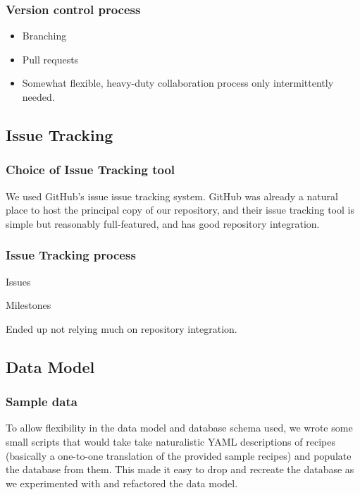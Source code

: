 \subsubsection{Version control process}

\begin{itemize}
\item Branching
\item Pull requests
\item Somewhat flexible, heavy-duty collaboration process only
  intermittently needed.
\end{itemize}

\subsection{Issue Tracking}

\subsubsection{Choice of Issue Tracking tool}

We used GitHub's issue issue tracking system. GitHub was already a
natural place to host the principal copy of our repository, and their
issue tracking tool is simple but reasonably full-featured, and
has good repository integration.

\subsubsection{Issue Tracking process}

Issues

Milestones

Ended up not relying much on repository integration.

\subsection{Data Model}

\subsubsection{Sample data}

To allow flexibility in the data model and database schema used, we
wrote some small scripts that would take take naturalistic YAML
descriptions of recipes (basically a one-to-one translation of the
provided sample recipes) and populate the database from them. This
made it easy to drop and recreate the database as we experimented with
and refactored the data model.

